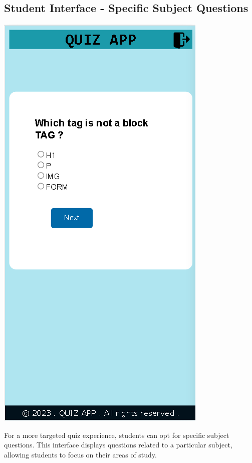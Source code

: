\subsection{Student Interface - Specific Subject Questions}
\begin{center}
    \includegraphics[scale=0.4]{project/images/QUIZ PANEL2.png}
\end{center}

For a more targeted quiz experience, students can opt for specific subject questions. This interface displays questions related to a particular subject, allowing students to focus on their areas of study.

